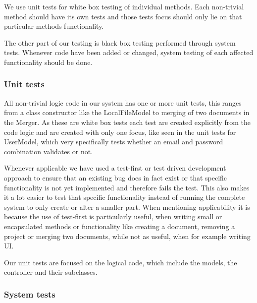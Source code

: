 We use unit tests for white box testing of individual methods. Each non-trivial method should have its own tests and those tests focus should only lie on that particular methods functionality.

The other part of our testing is black box testing performed through system tests. Whenever code have been added or changed, system testing of each affected functionality should be done.

\subsubsection{Unit tests}
All non-trivial logic code in our system has one or more unit tests, this ranges from a class constructor like the LocalFileModel to merging of two documents in the Merger. As these are white box tests each test are created explicitly from the code logic and are created with only one focus, like seen in the unit tests for UserModel, which very specifically tests whether an email and password combination validates or not.

Whenever applicable we have used a test-first or test driven development approach to ensure that an existing bug does in fact exist or that specific functionality is not yet implemented and therefore fails the test. This also makes it a lot easier to test that specific functionality instead of running the complete system to only create or alter a smaller part. When mentioning applicability it is because the use of test-first is particularly useful, when writing small  or encapsulated methods or functionality like creating a document, removing a project or merging two documents, while not as useful, when for example writing UI.

Our unit tests are focused on the logical code, which include the models, the controller and their subclasses.

\subsubsection{System tests}
